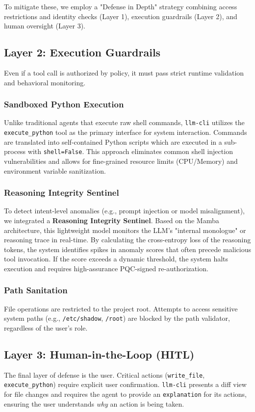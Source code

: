 \documentclass[conference]{IEEEtran}
\begin{document}
To mitigate these, we employ a "Defense in Depth" strategy combining access restrictions and identity checks (Layer 1), execution guardrails (Layer 2), and human oversight (Layer 3).

\subsection{Layer 2: Execution Guardrails}
Even if a tool call is authorized by policy, it must pass strict runtime validation and behavioral monitoring.

\subsubsection{Sandboxed Python Execution}
Unlike traditional agents that execute raw shell commands, \texttt{llm-cli} utilizes the \texttt{execute_python} tool as the primary interface for system interaction. Commands are translated into self-contained Python scripts which are executed in a sub-process with \texttt{shell=False}. This approach eliminates common shell injection vulnerabilities and allows for fine-grained resource limits (CPU/Memory) and environment variable sanitization.

\subsubsection{Reasoning Integrity Sentinel}
To detect intent-level anomalies (e.g., prompt injection or model misalignment), we integrated a \textbf{Reasoning Integrity Sentinel}. Based on the Mamba architecture, this lightweight model monitors the LLM's "internal monologue" or reasoning trace in real-time. By calculating the cross-entropy loss of the reasoning tokens, the system identifies spikes in anomaly scores that often precede malicious tool invocation. If the score exceeds a dynamic threshold, the system halts execution and requires high-assurance PQC-signed re-authorization.

\subsubsection{Path Sanitation}
File operations are restricted to the project root. Attempts to access sensitive system paths (e.g., \texttt{/etc/shadow}, \texttt{/root}) are blocked by the path validator, regardless of the user's role.

\subsection{Layer 3: Human-in-the-Loop (HITL)}
The final layer of defense is the user. Critical actions (\texttt{write\_file}, \texttt{execute_python}) require explicit user confirmation. \texttt{llm-cli} presents a diff view for file changes and requires the agent to provide an \texttt{explanation} for its actions, ensuring the user understands \textit{why} an action is being taken.
\end{document}
